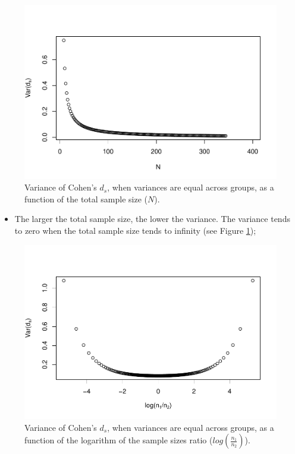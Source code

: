 \documentclass[
  english,
  man]{apa6}
\providecommand{\tightlist}{%
  \setlength{\itemsep}{0pt}\setlength{\parskip}{0pt}}
\begin{document}
\begin{figure}
\centering
\includegraphics{Theoretical-Variance-of-all-estimators-as-a-function-of-population-parameters_files/figure-latex/varcohendNsize2-1.pdf}
\caption{\label{fig:varcohendNsize2}Variance of Cohen's \(d_s\), when variances are equal across groups, as a function of the total sample size (\(N\)).}
\end{figure}

\begin{itemize}
\tightlist
\item
  The larger the total sample size, the lower the variance. The variance tends to zero when the total sample size tends to infinity (see Figure \ref{fig:varcohendNsize2});
\end{itemize}

\begin{figure}
\centering
\includegraphics{Theoretical-Variance-of-all-estimators-as-a-function-of-population-parameters_files/figure-latex/varcohenNratio2-1.pdf}
\caption{\label{fig:varcohenNratio2}Variance of Cohen's \(d_s\), when variances are equal across groups, as a function of the logarithm of the sample sizes ratio (\(log\left(\frac{n_1}{n_2} \right)\)).}
\end{figure}
\end{document}
